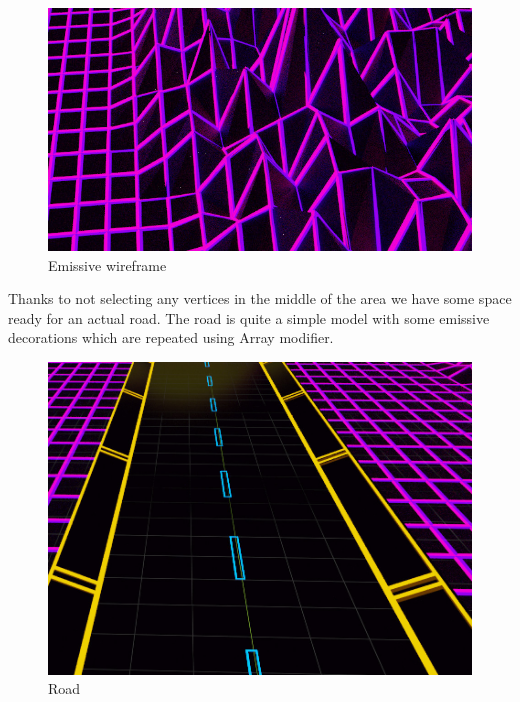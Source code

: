\documentclass[12pt,a4paper,titlepage,final]{report}
\begin{document}
\begin{figure}[H]
    \centering
    \includegraphics{images/rand_grid.jpg}
    \caption{Emissive wireframe}
    \label{fig:rand_grid}
\end{figure}

Thanks to not selecting any vertices in the middle of the area we have some space ready for an actual road. The road is quite a simple model with some emissive decorations which are repeated using Array modifier.
\begin{figure}[H]
    \centering
    \includegraphics{images/road.jpg}
    \caption{Road}
    \label{fig:road}
\end{figure}
\end{document}
